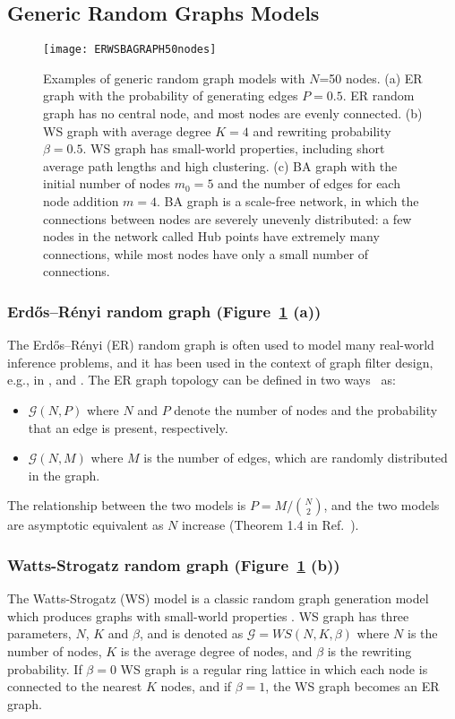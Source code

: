 \documentclass[journal]{IEEEtran}
\begin{document}
\subsection{Generic Random Graphs Models}
\begin{figure}[htb]
    \centering
    \texttt{[image: ERWSBAGRAPH50nodes]}
    \caption{Examples of generic random graph models with $N$=50 nodes. (a) ER graph with the probability of generating edges $P=0.5$. 
    ER random graph has no central node, and most nodes are evenly connected.
    (b) WS graph with average degree $K=4$ and rewriting probability $\beta=0.5$. WS graph has small-world properties, including short average path lengths and high clustering. (c) BA graph with the initial number of nodes $m_0=5$ and the number of edges for each node addition $m=4$.
    BA graph is a scale-free network, in which the connections between nodes are severely unevenly distributed: a few nodes in the network called Hub points have extremely many connections, while most nodes have only a small number of connections.
    }
    \label{fig:ERWSBA}
\end{figure}
\subsubsection{Erdős–Rényi random graph (Figure~\ref{fig:ERWSBA} (a))}
The Erdős–Rényi (ER) random graph is often used to model many real-world inference problems, and it has been used in the context of graph filter design, e.g., in \cite{segarra2017network}, \cite{mei2016signal} and \cite{nassif2018distributed}. The ER graph topology can be defined in two ways~\cite{frieze2015introduction} as:
\begin{itemize}
	\item 
	$\mathcal{G}(N,P)$ where $N$ and $P$ denote  the number of nodes and the probability that an edge is present, respectively.
	\item
	$\mathcal{G}(N,M)$ where $M$ is the number of edges, which are randomly distributed in the graph.
\end{itemize}
The relationship between the two models
is $P=M/\binom{N}{2}$, %
and the two models are asymptotic equivalent as $N$ increase (Theorem 1.4 in Ref.~\cite{frieze2015introduction}).	
\subsubsection{Watts-Strogatz random graph (Figure~\ref{fig:ERWSBA} (b))}
The Watts-Strogatz (WS) model is a classic random graph generation model which produces graphs with small-world properties \cite{Watts1998Collective}.
WS graph has three parameters, $N$, $K$ and $\beta$, and is denoted as $\mathcal{G}=WS(N, K,\beta)$ where $N$ is the number of nodes, $K$ is the average degree of nodes, and $\beta$ is the rewriting probability. If $\beta=0$ WS graph is a regular ring lattice in which each node is connected to the nearest $K$ nodes, and if $\beta=1$, the WS graph becomes an ER graph.
\end{document}
